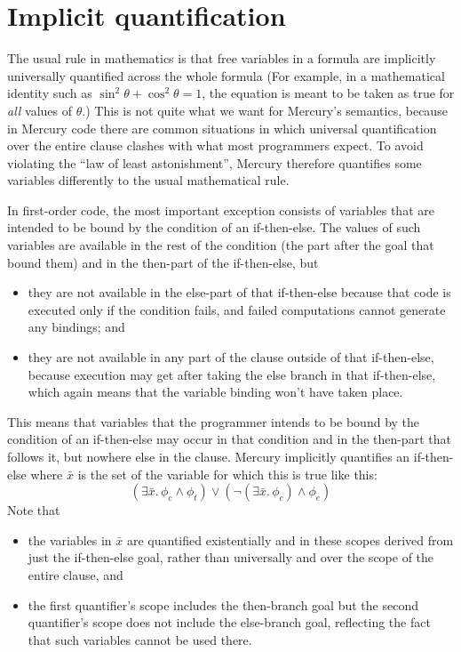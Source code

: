\section{Implicit quantification}
\label{sec:implicit-quantification}

The usual rule in mathematics
is that free variables in a formula
are implicitly universally quantified across the whole formula%
(For example,
in a mathematical identity such as
$\sin^2\theta + \cos^2\theta = 1$,
the equation is meant to be taken as true
for \emph{all} values of $\theta$.)
This is not quite what we want for Mercury's semantics,
because in Mercury code there are common situations
in which universal quantification over the entire clause
clashes with what most programmers expect.
To avoid violating the ``law of least astonishment'',
Mercury therefore quantifies some variables
differently to the usual mathematical rule.

In first-order code,
the most important exception consists of variables
that are intended to be bound by the condition of an if-then-else.
The values of such variables are available
in the rest of the condition (the part after the goal that bound them)
and in the then-part of the if-then-else, but
\begin{itemize}
\item
they are not available in the else-part of that if-then-else
because that code is executed only if the condition fails,
and failed computations cannot generate any bindings; and
\item
they are not available in any part of the clause outside of that if-then-else,
because execution may get after taking the else branch in that if-then-else,
which again means that the variable binding won't have taken place.
\end{itemize}

This means that variables that
the programmer intends to be bound by the condition of an if-then-else
may occur in that condition and in the then-part that follows it,
but nowhere else in the clause.
Mercury implicitly quantifies an if-then-else 
where $\bar{x}$ is the set of the variable for which this is true
like this:
\[
    (\exists \bar{x}.\, \phi_c \land \phi_t) \lor
    (\lnot (\exists \bar{x}.\, \phi_c) \land \phi_e)
\]
Note that
\begin{itemize}
\item
the variables in $\bar{x}$ are quantified existentially
and in these scopes derived from just the if-then-else goal,
rather than universally and over the scope of the entire clause, and
\item
the first quantifier's scope includes the then-branch goal
but the second quantifier's scope does not include the else-branch goal,
reflecting the fact that such variables cannot be used there.
\end{itemize}

